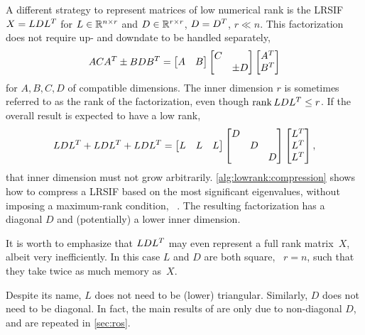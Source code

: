 A different strategy to represent matrices of low numerical rank is the \ac{LRSIF} \cite{Benner2009,Lang2015}
$X = LDL^T$ for $L\in\mathbb{R}^{n\times r}$ and $D\in\mathbb{R}^{r \times r}$, $D=D^T$, $r\ll n$.
This factorization does not require up- and downdate to be handled separately,
\begin{equation}
  ACA^T \pm BDB^T =
  \begin{bmatrix}
    A & B
  \end{bmatrix}
  \begin{bmatrix}
    C \\ & \pm D
  \end{bmatrix}
  \begin{bmatrix}
    A^T \\ B^T
  \end{bmatrix}
\end{equation}
for $A, B, C, D$ of compatible dimensions.
The inner dimension $r$ is sometimes referred to as the rank of the factorization,
even though $\operatorname{rank} LDL^T \leq r$.
If the overall result is expected to have a low rank,
\eg
\begin{equation}
  LDL^T + LDL^T + LDL^T
  = \begin{bmatrix}
    L & L & L
  \end{bmatrix}
  \begin{bmatrix}
    D \\
    & D \\
    && D
  \end{bmatrix}
  \begin{bmatrix}
    L^T \\
    L^T \\
    L^T
  \end{bmatrix}
  ,
\end{equation}
that inner dimension must not grow arbitrarily.
\autoref{alg:lowrank:compression} shows how to compress a \ac{LRSIF}
based on the most significant eigenvalues,
without imposing a maximum-rank condition,
\cf~\cite[Section~6.3.3]{Lang2017}.
The resulting factorization has a diagonal $D$ and (potentially) a lower inner dimension.

\begin{remark}
  It is worth to emphasize that $LDL^T$ may even represent a full rank matrix~$X$,
  albeit very inefficiently.
  In this case $L$ and $D$ are both square, \ie~$r=n$,
  such that they take twice as much memory as~$X$.
\end{remark}

\begin{remark}
  Despite its name, $L$ does not need to be (lower) triangular.
  Similarly, $D$ does not need to be diagonal.
  In fact, the main results of \cite{Lang2015} are only due to non-diagonal $D$,
  and are repeated in \autoref{sec:ros}.
\end{remark}

